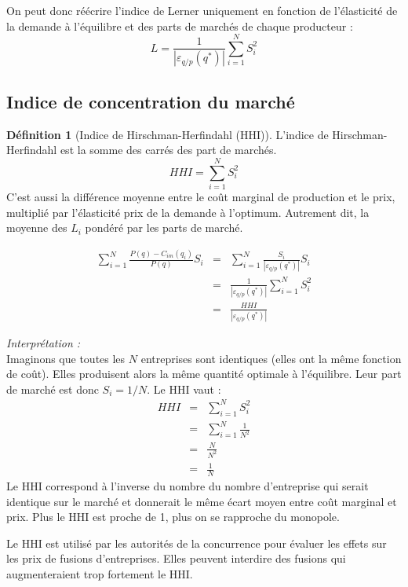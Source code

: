 \documentclass[
]{book}
\theoremstyle{definition}
\newtheorem{definition}{Définition}[chapter]
\theoremstyle{definition}
\theoremstyle{definition}
\theoremstyle{definition}
\theoremstyle{remark}
\begin{document}
On peut donc réécrire l'indice de Lerner uniquement en fonction de l'élasticité de la demande à l'équilibre et des parts de marchés de chaque producteur :
\[
L=\frac{1}{\left|\varepsilon_{q/p}(q^*)\right|}\sum_{i=1}^NS_i^2
\]

\hypertarget{indice-de-concentration-du-marchuxe9}{%
\subsection{Indice de concentration du marché}\label{indice-de-concentration-du-marchuxe9}}

\begin{definition}[Indice de Hirschman-Herfindahl (HHI)]
\protect\hypertarget{def:HHI}{}\label{def:HHI}L'indice de Hirschman-Herfindahl est la somme des carrés des part de marchés.
\[HHI = \sum_{i=1}^NS_i^2\]
C'est aussi la différence moyenne entre le coût marginal de production et le prix, multiplié par l'élasticité prix de la demande à l'optimum.
Autrement dit, la moyenne des \(L_i\) pondéré par les parts de marché.
\end{definition}

\[
 \begin{array}{rcl}
 \sum_{i=1}^{N}\frac{P(q) -C_{im}(q_i)}{P(q)}S_i &=&\sum_{i=1}^{N} \frac{S_i}{\left|\varepsilon_{q/p}(q^*)\right|}S_i \\
 &=&\frac{1}{\left|\varepsilon_{q/p}(q^*)\right|}\sum_{i=1}^NS_i^2\\
 &=&\frac{HHI}{\left|\varepsilon_{q/p}(q^*)\right|}
 \end{array}
 \]

\emph{Interprétation :}\\
Imaginons que toutes les \(N\) entreprises sont identiques (elles ont la même fonction de coût).
Elles produisent alors la même quantité optimale à l'équilibre.
Leur part de marché est donc \(S_i=1/N\).
Le HHI vaut :
\[
\begin{array}{rcl}
HHI&=&\sum_{i=1}^NS_i^2\\
&=&\sum_{i=1}^N\frac{1}{N^2}\\
&=&\frac{N}{N^2} \\
&=&\frac{1}{N}
\end{array}
\]
Le HHI correspond à l'inverse du nombre du nombre d'entreprise qui serait identique sur le marché et donnerait le même écart moyen entre coût marginal et prix.
Plus le HHI est proche de 1, plus on se rapproche du monopole.

Le HHI est utilisé par les autorités de la concurrence pour évaluer les effets sur les prix de fusions d'entreprises.
Elles peuvent interdire des fusions qui augmenteraient trop fortement le HHI.
\end{document}
